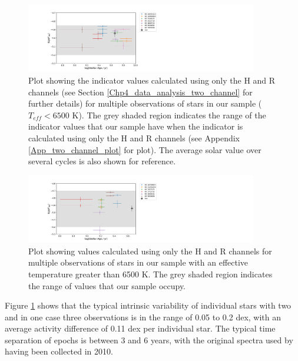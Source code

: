 \begin{figure}
    \centering
    \includegraphics[width=0.9\textwidth]{Figures/4-Chromospheric_age/cool_multiple_obs_plot_with_sun.pdf}
    \caption[Plot showing activity over several epochs for stars with $T_{eff} < 6500$ K]{Plot showing the \Rprime indicator values calculated using only the H and R channels (see Section \ref{Chp4_data_analysis_two_channel} for further details) for multiple observations of stars in our sample ($T_{eff} < 6500$ K). The grey shaded region indicates the range of the \Rprime indicator values that our sample have when the \Rprime indicator is calculated using only the H and R channels (see Appendix \ref{App_two_channel_plot} for plot). The average solar value over several cycles \citep{Egeland_etal_2017} is also shown for reference.}
    \label{fig:ca_multiple_obs}
\end{figure}

\begin{figure}
    \centering
    \includegraphics[width=0.9\textwidth]{Figures/4-Chromospheric_age/hot_multiple_obs_plot_with_sun.pdf}
    \caption[Plot showing activity over several epochs for stars with $T_{eff} > 6500$ K]{Plot showing \Rprime values calculated using only the H and R channels for multiple observations of stars in our sample with an effective temperature greater than 6500 K. The grey shaded region indicates the range of \Rprime values that our sample occupy.}
    \label{fig:ca_multiple_obs_hot_Fstars}
\end{figure}

Figure \ref{fig:ca_multiple_obs} shows that the typical intrinsic variability of individual stars with two and in one case three observations is in the range of 0.05 to 0.2 dex, with an average activity difference of 0.11 dex per individual star. The typical time separation of epochs is between 3 and 6 years, with the original spectra used by \citet{Bruntt_etal_2012} having been collected in 2010. 

